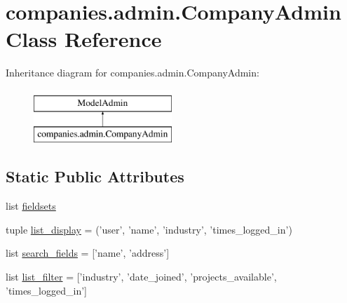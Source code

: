 \hypertarget{classcompanies_1_1admin_1_1_company_admin}{\section{companies.\-admin.\-Company\-Admin Class Reference}
\label{classcompanies_1_1admin_1_1_company_admin}
}
Inheritance diagram for companies.\-admin.\-Company\-Admin\-:\begin{figure}[H]
\begin{center}
\leavevmode
\includegraphics[height=2.000000cm]{classcompanies_1_1admin_1_1_company_admin}
\end{center}
\end{figure}
\subsection*{Static Public Attributes}
\begin{DoxyCompactItemize}
\item 
list \hyperlink{classcompanies_1_1admin_1_1_company_admin_a2d93c6598f4c7641fe11eb1d94e67735}{fieldsets}
\item 
tuple \hyperlink{classcompanies_1_1admin_1_1_company_admin_abb4744d6d299e31f3dd04cf568f99316}{list\-\_\-display} = ('user', 'name', 'industry', 'times\-\_\-logged\-\_\-in')
\item 
list \hyperlink{classcompanies_1_1admin_1_1_company_admin_ae59cc3241149e85ca34e69ac730718bd}{search\-\_\-fields} = \mbox{[}'name', 'address'\mbox{]}
\item 
list \hyperlink{classcompanies_1_1admin_1_1_company_admin_a285da13dddd652fd19fcfd2612b12d5a}{list\-\_\-filter} = \mbox{[}'industry', 'date\-\_\-joined', 'projects\-\_\-available', 'times\-\_\-logged\-\_\-in'\mbox{]}
\end{DoxyCompactItemize}


